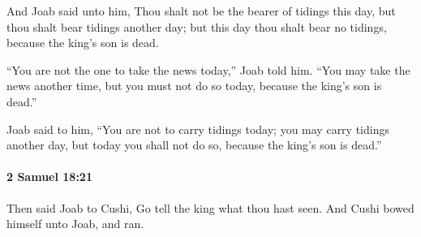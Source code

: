 			\begin{versebox}
					\item[BHS] 
					\item[ASV] And Joab said unto him, Thou shalt not be the bearer of tidings this day, but thou shalt bear tidings another day; but this day thou shalt bear no tidings, because the king's son is dead.
					\item[NIV] “You are not the one to take the news today,” Joab told him. “You may take the news another time, but you must not do so today, because the king’s son is dead.”
					\item[NRSV] Joab said to him, “You are not to carry tidings today; you may carry tidings another day, but today you shall not do so, because the king’s son is dead.”
			\end{versebox}

		\paragraph{2 Samuel 18:21} %
			\label{2SAMUEL-18-21}

			Then said Joab to Cushi, Go tell the king what thou hast seen. And Cushi bowed himself unto Joab, and ran.

